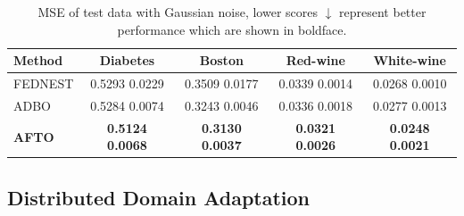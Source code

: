 \documentclass[letterpaper]{article} %
\begin{document}
\renewcommand\arraystretch{1}
\renewcommand\tabcolsep{10pt}
\begin{table}[t]
\centering
\renewcommand{\thetable}{\arabic{table}}
{
\begin{tabular}{l|c|c|c|c}
\toprule
Method   & Diabetes   & Boston  & Red-wine & White-wine   \\ \hline
FEDNEST  &  0.5293  0.0229 & 0.3509  0.0177 &  0.0339  0.0014  & 0.0268  0.0010  \\
ADBO  &  0.5284  0.0074 & 0.3243  0.0046 & 0.0336  0.0018 & 0.0277  0.0013  \\ \hline
\textbf{AFTO} & \textbf{0.5124}  \textbf{0.0068}  & \textbf{0.3130}  \textbf{0.0037} & \textbf{0.0321}  \textbf{0.0026} & \textbf{0.0248}  \textbf{0.0021} \\

\bottomrule
\end{tabular}}
\caption{MSE of test data with Gaussian noise, lower scores $\downarrow$ represent better performance which are shown in boldface.}
\label{tab:ADBO-ATOP}
\end{table}



\subsection{Distributed Domain Adaptation}
\end{document}
